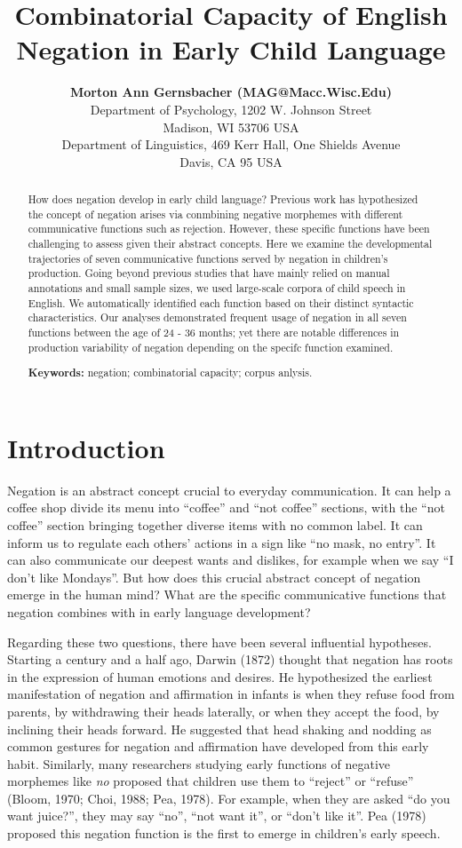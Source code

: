 \documentclass[10pt, letterpaper]{article}
\title{Combinatorial Capacity of English Negation in Early Child Language}
\author{{\large \bf Morton Ann Gernsbacher (MAG@Macc.Wisc.Edu)} \\ Department of Psychology, 1202 W. Johnson Street \\ Madison, WI 53706 USA \AND {\large \bf Masoud Jasbi (jasbi@ucdavis.edu)} \\ Department of Linguistics, 469 Kerr Hall, One Shields Avenue \\ Davis, CA 95 USA}
\begin{document}
\maketitle

\begin{abstract}
How does negation develop in early child language? Previous work has
hypothesized the concept of negation arises via conmbining negative
morphemes with different communicative functions such as rejection.
However, these specific functions have been challenging to assess given
their abstract concepts. Here we examine the developmental trajectories
of seven communicative functions served by negation in children's
production. Going beyond previous studies that have mainly relied on
manual annotations and small sample sizes, we used large-scale corpora
of child speech in English. We automatically identified each function
based on their distinct syntactic characteristics. Our analyses
demonstrated frequent usage of negation in all seven functions between
the age of 24 - 36 months; yet there are notable differences in
production variability of negation depending on the specifc function
examined.

\textbf{Keywords:}
negation; combinatorial capacity; corpus anlysis.
\end{abstract}

\hypertarget{introduction}{%
\section{Introduction}\label{introduction}}

Negation is an abstract concept crucial to everyday communication. It
can help a coffee shop divide its menu into ``coffee'' and ``not
coffee'' sections, with the ``not coffee'' section bringing together
diverse items with no common label. It can inform us to regulate each
others' actions in a sign like ``no mask, no entry''. It can also
communicate our deepest wants and dislikes, for example when we say ``I
don't like Mondays''. But how does this crucial abstract concept of
negation emerge in the human mind? What are the specific communicative
functions that negation combines with in early language development?

Regarding these two questions, there have been several influential
hypotheses. Starting a century and a half ago, Darwin (1872) thought
that negation has roots in the expression of human emotions and desires.
He hypothesized the earliest manifestation of negation and affirmation
in infants is when they refuse food from parents, by withdrawing their
heads laterally, or when they accept the food, by inclining their heads
forward. He suggested that head shaking and nodding as common gestures
for negation and affirmation have developed from this early habit.
Similarly, many researchers studying early functions of negative
morphemes like \emph{no} proposed that children use them to ``reject''
or ``refuse'' (Bloom, 1970; Choi, 1988; Pea, 1978). For example, when
they are asked ``do you want juice?'', they may say ``no'', ``not want
it'', or ``don't like it''. Pea (1978) proposed this negation function
is the first to emerge in children's early speech.
\end{document}
